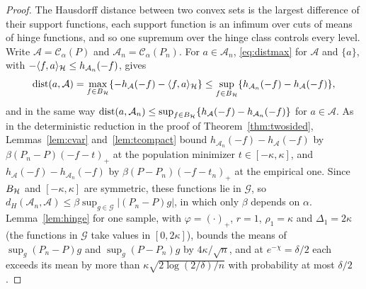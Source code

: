 \begin{proof}
The Hausdorff distance between two convex sets is the largest difference of their support functions, each support
function is an infimum over cuts of means of hinge functions, and so one supremum over the hinge class controls every
level. Write $\mathcal A=\mathcal C_\alpha(P)$ and $\mathcal A_n=\mathcal C_\alpha(P_n)$. For $a\in\mathcal A_n$, \eqref{eq:distmax}
for $\mathcal A$ and $\{a\}$, with $-\langle f,a\rangle_{\mathcal{H}}\le h_{\mathcal A_n}(-f)$, gives
\[
\operatorname{dist}(a,\mathcal A)=\max_{f\in B_{\mathcal{H}}}\{-h_{\mathcal A}(-f)-\langle f,a\rangle_{\mathcal{H}}\}
\le\sup_{f\in B_{\mathcal{H}}}\{h_{\mathcal A_n}(-f)-h_{\mathcal A}(-f)\},
\]
and in the same way
$\operatorname{dist}(a,\mathcal A_n)\le\sup_{f\in B_{\mathcal{H}}}\{h_{\mathcal A}(-f)-h_{\mathcal A_n}(-f)\}$ for $a\in\mathcal A$. As in
the deterministic reduction in the proof of Theorem~\ref{thm:twosided}, Lemmas~\ref{lem:cvar} and~\ref{lem:tcompact} bound
$h_{\mathcal A_n}(-f)-h_{\mathcal A}(-f)$ by $\beta(P_n-P)(-f-t)_+$ at the population minimizer $t\in[-\kappa,\kappa]$, and
$h_{\mathcal A}(-f)-h_{\mathcal A_n}(-f)$ by $\beta(P-P_n)(-f-t_n)_+$ at the empirical one. Since $B_{\mathcal{H}}$ and
$[-\kappa,\kappa]$ are symmetric, these functions lie in $\mathcal G$, so $d_H(\mathcal A_n,\mathcal A)\le\beta
\sup_{g\in\mathcal G}|(P_n-P)g|$, in which only $\beta$ depends on $\alpha$.
Lemma~\ref{lem:hinge} for one sample, with $\varphi=(\cdot)_+$, $r=1$, $\rho_1=\kappa$ and $\Delta_1=2\kappa$ (the functions in
$\mathcal G$ take values in $[0,2\kappa]$), bounds the means of $\sup_g(P_n-P)g$ and $\sup_g(P-P_n)g$ by $4\kappa/\sqrt n$,
and at $e^{-\chi}=\delta/2$ each exceeds its mean by more than $\kappa\sqrt{2\log(2/\delta)/n}$ with probability at most
$\delta/2$.
\end{proof}

